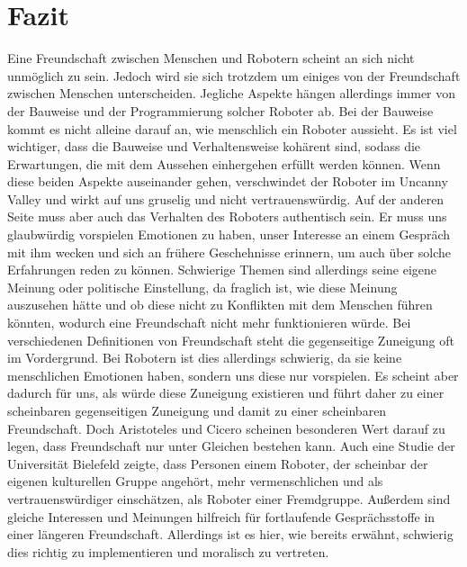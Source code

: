 \documentclass[12pt]{article}
\begin{document}
\section{Fazit}
Eine Freundschaft zwischen Menschen und Robotern scheint an sich nicht unmöglich zu sein. Jedoch wird sie sich trotzdem um einiges von der Freundschaft zwischen Menschen unterscheiden. Jegliche Aspekte hängen allerdings immer von der Bauweise und der Programmierung solcher Roboter ab. \newline
Bei der Bauweise kommt es nicht alleine darauf an, wie menschlich ein Roboter aussieht. Es ist viel wichtiger, dass die Bauweise und Verhaltensweise kohärent sind, sodass die Erwartungen, die mit dem Aussehen einhergehen erfüllt werden können. Wenn diese beiden Aspekte auseinander gehen, verschwindet der Roboter im Uncanny Valley und wirkt auf uns gruselig und nicht vertrauenswürdig.\newline
Auf der anderen Seite muss aber auch das Verhalten des Roboters authentisch sein. Er muss uns glaubwürdig vorspielen Emotionen zu haben, unser Interesse an einem Gespräch mit ihm wecken und sich an frühere Geschehnisse erinnern, um auch über solche Erfahrungen reden zu können.
Schwierige Themen sind allerdings seine eigene Meinung oder politische Einstellung, da fraglich ist, wie diese Meinung auszusehen hätte und ob diese nicht zu Konflikten mit dem Menschen führen könnten, wodurch eine Freundschaft nicht mehr funktionieren würde.\newline
Bei verschiedenen Definitionen von Freundschaft steht die gegenseitige Zuneigung oft im Vordergrund. Bei Robotern ist dies allerdings schwierig, da sie keine menschlichen Emotionen haben, sondern uns diese nur vorspielen. Es scheint aber dadurch für uns, als würde diese Zuneigung existieren und führt daher zu einer scheinbaren gegenseitigen Zuneigung und damit zu einer scheinbaren Freundschaft. \newline
Doch Aristoteles und Cicero scheinen besonderen Wert darauf zu legen, dass Freundschaft nur unter Gleichen bestehen kann. Auch eine Studie der Universität Bielefeld zeigte, dass Personen einem Roboter, der scheinbar der eigenen kulturellen Gruppe angehört, mehr vermenschlichen und als vertrauenswürdiger einschätzen, als Roboter einer Fremdgruppe. Außerdem sind gleiche Interessen und Meinungen hilfreich für fortlaufende Gesprächsstoffe in einer längeren Freundschaft. Allerdings ist es hier, wie bereits erwähnt, schwierig dies richtig zu implementieren und moralisch zu vertreten.\newline
\end{document}
